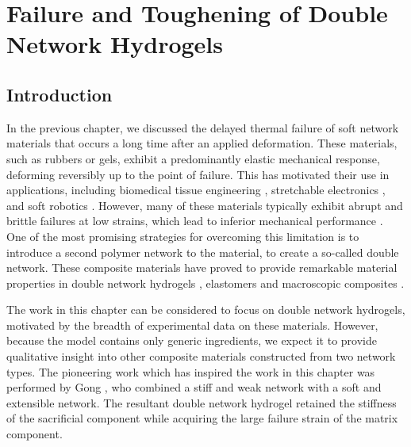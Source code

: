 
\setcounter{equation}{0}
\chapter{Failure and Toughening of Double Network Hydrogels} \label{sec:DoubleNetworks}

\section{Introduction}

In the previous chapter, we discussed the delayed thermal failure of soft network materials that occurs a long time after an applied deformation. These materials, such as rubbers or gels, exhibit a predominantly elastic mechanical response, deforming reversibly up to the point of failure. This has motivated their use in applications, including biomedical tissue engineering \cite{leeHydrogelsTissueEngineering2001}, stretchable electronics \cite{rogers_materials_2010}, and soft robotics \cite{martinezSoftActuatorsRobots2014}. However, many of these materials typically exhibit abrupt and brittle failures at low strains, which lead to inferior mechanical performance \cite{Creton50th2017}. One of the most promising strategies for overcoming this limitation is to introduce a second polymer network to the material, to create a so-called double network. These composite materials have proved to provide remarkable material properties in double network hydrogels \cite{gong_why_2010, nakajima_synthesis_2013, sun_highly_2012, xin_effect_2013}, elastomers \cite{ducrot_toughening_2014, millereauMechanicsElastomericMolecular2018} and macroscopic composites \cite{kingMacroscaleDoubleNetworks2019,takahashiCreatingStiffTough2018}.

The work in this chapter can be considered to focus on double network hydrogels, motivated by the breadth of experimental data on these materials. However, because the model contains only generic ingredients, we expect it to provide qualitative insight into other composite materials constructed from two network types. The pioneering work which has inspired the work in this chapter was performed by Gong \etal \cite{gong_double-network_2003}, who combined a stiff and weak  network with a soft and extensible  network. The resultant double network hydrogel retained the stiffness of the sacrificial component while acquiring the large failure strain of the matrix component.

